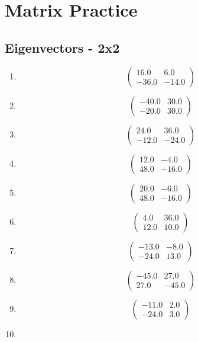 \documentclass{article}%
\begin{document}
%
\normalsize%
\section{Matrix Practice}%
\subsection{Eigenvectors {-} 2x2}%
\begin{enumerate}[label=\arabic*)]%
\item%
\[%
\begin{pmatrix}%
16.0&6.0\\%
-36.0&-14.0%
\end{pmatrix}%
\]%
\item%
\[%
\begin{pmatrix}%
-40.0&30.0\\%
-20.0&30.0%
\end{pmatrix}%
\]%
\item%
\[%
\begin{pmatrix}%
24.0&36.0\\%
-12.0&-24.0%
\end{pmatrix}%
\]%
\item%
\[%
\begin{pmatrix}%
12.0&-4.0\\%
48.0&-16.0%
\end{pmatrix}%
\]%
\item%
\[%
\begin{pmatrix}%
20.0&-6.0\\%
48.0&-16.0%
\end{pmatrix}%
\]%
\item%
\[%
\begin{pmatrix}%
4.0&36.0\\%
12.0&10.0%
\end{pmatrix}%
\]%
\item%
\[%
\begin{pmatrix}%
-13.0&-8.0\\%
-24.0&13.0%
\end{pmatrix}%
\]%
\item%
\[%
\begin{pmatrix}%
-45.0&27.0\\%
27.0&-45.0%
\end{pmatrix}%
\]%
\item%
\[%
\begin{pmatrix}%
-11.0&2.0\\%
-24.0&3.0%
\end{pmatrix}%
\]%
\item%

\end{enumerate}
\end{document}
